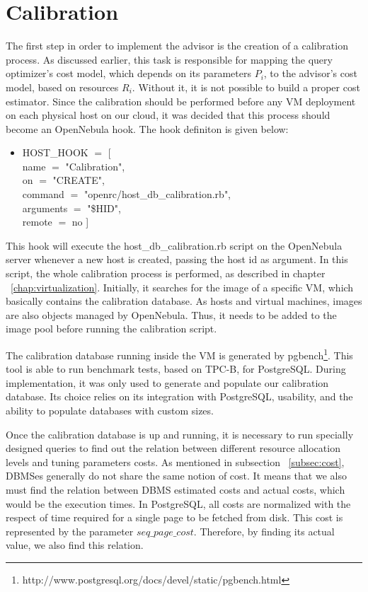 \section{Calibration}
\label{sec:calib}

The first step in order to implement the advisor is the creation of a calibration process. As discussed earlier, this task is responsible for mapping the query optimizer's cost model, which depends on its parameters $P_{i}$, to  the advisor's cost model, based on resources $R_{i}$. Without it, it is not possible to build a proper cost estimator. Since the calibration should be performed before any VM deployment on each physical host on our cloud, it was decided that this process should become an OpenNebula hook. The hook definiton is given below:
\begin{itemize}
 \item HOST\_HOOK $=$ [ \\
    name      $=$ "Calibration",\\
    on        $=$ "CREATE",\\
    command   $=$ "openrc/host\_db\_calibration.rb",\\
    arguments $=$ "\$HID",\\
    remote    $=$ no ]\\
\end{itemize}

This hook will execute the host\_db\_calibration.rb script on the OpenNebula server whenever a new host is created, passing the host id as argument. In this script, the whole calibration process is performed, as described in chapter ~\ref{chap:virtualization}. Initially, it searches for the image of a specific VM, which basically contains the calibration database. As hosts and virtual machines, images are also objects managed by OpenNebula. Thus, it needs to be added to the image pool before running the calibration script.

The calibration database running inside the VM is generated by pgbench\footnote{http://www.postgresql.org/docs/devel/static/pgbench.html}. This tool is able to run benchmark tests, based on TPC-B, for PostgreSQL. During implementation, it was only used to generate and populate our calibration database. Its choice relies on its integration with PostgreSQL, usability, and the ability to populate databases with custom sizes.

Once the calibration database is up and running, it is necessary to run specially designed queries to find out the relation between different resource allocation levels and tuning parameters costs.  As mentioned in subsection ~\ref{subsec:cost}, DBMSes generally do not  share the same notion of cost. It means that we also must find the relation between DBMS estimated costs and actual costs, which would be the execution times. In PostgreSQL, all costs are normalized with the respect of time required for a single page to be fetched from disk. This cost is represented by the parameter $seq\_page\_cost$. Therefore, by finding its actual value, we also find this relation. 


